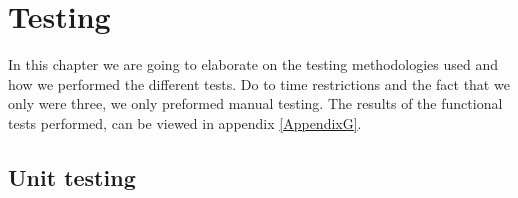 
\chapter{Testing}
\label{Testing}
\nocite{SoftwareTesting}










In this chapter we are going to elaborate on the testing methodologies used and how we performed the different tests.
Do to time restrictions and the fact that we only were three, we only preformed manual testing.
The results of the functional tests performed, can be viewed in appendix \ref{AppendixG}.

\section{Unit testing}

